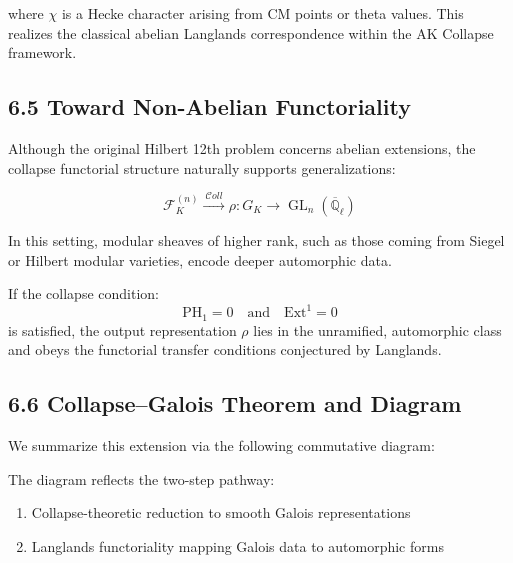 \documentclass[11pt]{article}
\begin{document}
where \( \chi \) is a Hecke character arising from CM points or theta values.  
This realizes the classical abelian Langlands correspondence within the AK Collapse framework.

\subsection{6.5 Toward Non-Abelian Functoriality}

Although the original Hilbert 12th problem concerns abelian extensions, the collapse functorial structure naturally supports generalizations:

\[
\mathcal{F}_K^{(n)} \xrightarrow{\ \mathcal{C}oll\ } \rho : G_K \to \operatorname{GL}_n(\overline{\mathbb{Q}}_\ell)
\]

In this setting, modular sheaves of higher rank, such as those coming from Siegel or Hilbert modular varieties, encode deeper automorphic data.

If the collapse condition:
\[
\mathrm{PH}_1 = 0 \quad \text{and} \quad \mathrm{Ext}^1 = 0
\]
is satisfied, the output representation \( \rho \) lies in the unramified, automorphic class and obeys the functorial transfer conditions conjectured by Langlands.

\subsection{6.6 Collapse–Galois Theorem and Diagram}

We summarize this extension via the following commutative diagram:

\begin{center}
\end{center}

The diagram reflects the two-step pathway:
\begin{enumerate}
    \item Collapse-theoretic reduction to smooth Galois representations
    \item Langlands functoriality mapping Galois data to automorphic forms
\end{enumerate}
\end{document}
